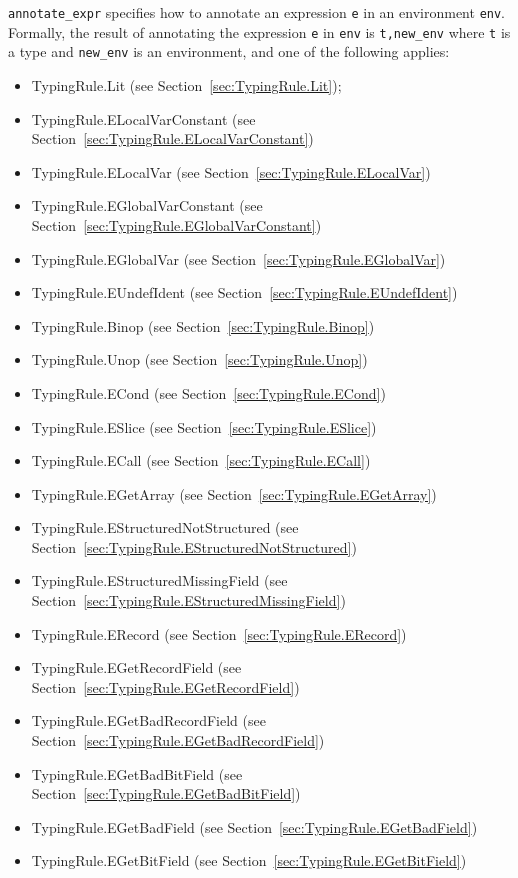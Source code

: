\documentclass{book}
\begin{document}
\texttt{annotate\_expr} specifies how to annotate an expression \texttt{e} in
an environment \texttt{env}.  Formally, the result of annotating the expression
\texttt{e} in \texttt{env} is \texttt{t,new\_env} where \texttt{t} is a type and
\texttt{new\_env} is an environment, and one of the following applies:
\begin{itemize}
\item TypingRule.Lit (see Section~\ref{sec:TypingRule.Lit});
\item TypingRule.ELocalVarConstant (see Section~\ref{sec:TypingRule.ELocalVarConstant})
\item TypingRule.ELocalVar (see Section~\ref{sec:TypingRule.ELocalVar})
\item TypingRule.EGlobalVarConstant (see Section~\ref{sec:TypingRule.EGlobalVarConstant})
\item TypingRule.EGlobalVar (see Section~\ref{sec:TypingRule.EGlobalVar})
\item TypingRule.EUndefIdent (see Section~\ref{sec:TypingRule.EUndefIdent})
\item TypingRule.Binop (see Section~\ref{sec:TypingRule.Binop})
\item TypingRule.Unop (see Section~\ref{sec:TypingRule.Unop})
\item TypingRule.ECond (see Section~\ref{sec:TypingRule.ECond})
\item TypingRule.ESlice (see Section~\ref{sec:TypingRule.ESlice})
\item TypingRule.ECall (see Section~\ref{sec:TypingRule.ECall})
\item TypingRule.EGetArray (see Section~\ref{sec:TypingRule.EGetArray})
\item TypingRule.EStructuredNotStructured (see Section~\ref{sec:TypingRule.EStructuredNotStructured})
\item TypingRule.EStructuredMissingField (see Section~\ref{sec:TypingRule.EStructuredMissingField})
\item TypingRule.ERecord (see Section~\ref{sec:TypingRule.ERecord})
\item TypingRule.EGetRecordField (see Section~\ref{sec:TypingRule.EGetRecordField})
\item TypingRule.EGetBadRecordField (see Section~\ref{sec:TypingRule.EGetBadRecordField})
\item TypingRule.EGetBadBitField (see Section~\ref{sec:TypingRule.EGetBadBitField})
\item TypingRule.EGetBadField (see Section~\ref{sec:TypingRule.EGetBadField})
\item TypingRule.EGetBitField (see Section~\ref{sec:TypingRule.EGetBitField})

\end{itemize}
\end{document}
